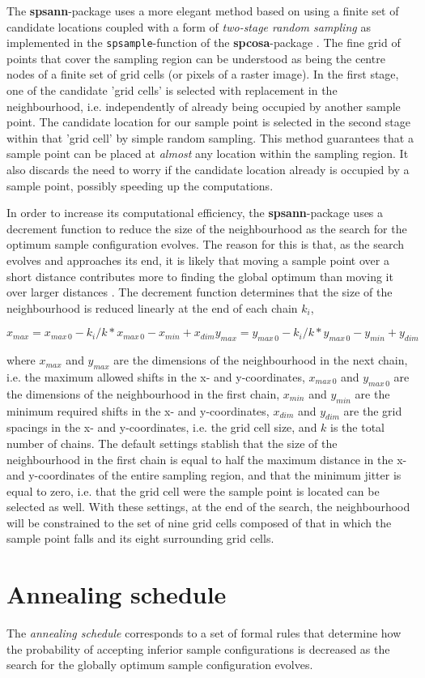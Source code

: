 The \textbf{spsann}-package uses a more elegant method based on using a finite
set of candidate locations coupled with a form of \textit{two-stage random 
sampling} as implemented in the \texttt{spsample}-function of the 
\textbf{spcosa}-package \citep{WalvoortEtAl2010}. The fine grid of points that 
cover the sampling region can be understood as being the centre nodes of a 
finite set of grid cells (or pixels of a raster image). In the first stage, one 
of the candidate 'grid cells' is selected with replacement in the neighbourhood,
i.e. independently of already being occupied by another sample point. The 
candidate location for our sample point is selected in the second stage within 
that 'grid cell' by simple random sampling. This method guarantees that a sample
 point can be placed at \textit{almost} any location within the sampling region.
It also discards the need to worry if the candidate location already is occupied
by a sample point, possibly speeding up the computations.

In order to increase its computational efficiency, the \textbf{spsann}-package 
uses a decrement function to reduce the size of the neighbourhood as the search
for the optimum sample configuration evolves. The reason for this is that, as 
the search evolves and approaches its end, it is likely that moving a sample 
point over a short distance contributes more to finding the global optimum than 
moving it over larger distances \citep{GroenigenEtAl1998}. The decrement 
function determines that the size of the neighbourhood is reduced linearly at 
the end of each chain $k_i$,

\begin{equation}
  x_{max} = x_{max\,0} - k_i / k * x_{max\,0} - x_{min} + x_{dim}

  y_{max} = y_{max\,0} - k_i / k * y_{max\,0} - y_{min} + y_{dim}
\end{equation}

where $x_{max}$ and $y_{max}$ are the dimensions of the neighbourhood in the 
next chain, i.e. the maximum allowed shifts in the x- and y-coordinates, 
$x_{max\,0}$ and $y_{max\,0}$ are the dimensions of the neighbourhood in the 
first chain, $x_{min}$ and $y_{min}$ are the minimum required shifts in the x- 
and y-coordinates, $x_{dim}$ and $y_{dim}$ are the grid spacings in the x- and 
y-coordinates, i.e. the grid cell size, and $k$ is the total number of chains.
The default settings stablish that the size of the neighbourhood in the first
chain is equal to half the maximum distance in the x- and y-coordinates of the
entire sampling region, and that the minimum jitter is equal to zero, i.e. that
the grid cell were the sample point is located can be selected as well. With 
these settings, at the end of the search, the neighbourhood will be constrained 
to the set of nine grid cells composed of that in which the sample point falls
and its eight surrounding grid cells.

\section{Annealing schedule}

The \textit{annealing schedule} corresponds to a set of formal rules that 
determine how the probability of accepting inferior sample configurations is 
decreased as the search for the globally optimum sample configuration evolves.

